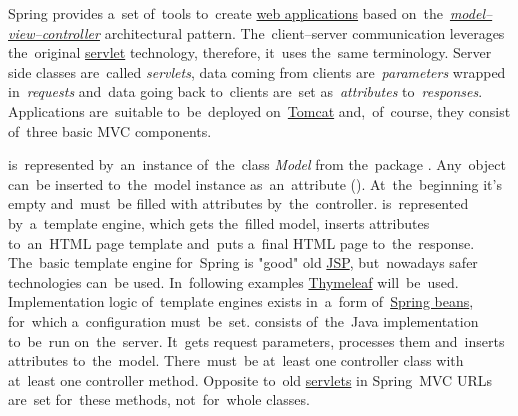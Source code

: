 
Spring provides a~set of~tools to~create \hyperref[webserviceapplication]{web applications} based on~the~\hyperref[mvc]{\textit{model--view--controller}} architectural pattern.
The~client--server communication leverages the~original \hyperref[servlet]{servlet} technology, therefore, it~uses the~same terminology.
Server side classes are~called \textit{servlets}, data coming from clients are~\textit{parameters} wrapped in~\textit{requests} and~data going back to~clients are~set as~\textit{attributes} to~\textit{responses}.
Applications are~suitable to~be~deployed on~\hyperref[tomcat]{Tomcat} and,~of~course, they consist of~three basic MVC components.

\begin{itemize}
     is~represented by~an~instance of~the~class \textit{Model} from the~package . Any~object can~be inserted to~the~model instance as~an~attribute ().
            At~the~beginning it's empty and~must~be filled with attributes by~the~controller.
     is~represented by~a~template engine, which gets the~filled model, inserts attributes to~an~HTML page template and~puts a~final HTML page to~the~response.
            The~basic template engine for~Spring is "good" old \hyperref[jsp]{JSP}, but~nowadays safer technologies can~be used.
            In~following examples \href{https://www.thymeleaf.org/}{Thymeleaf} will~be~used.
            Implementation logic of~template engines exists in~a~form of~\hyperref[springinversionofcontrol]{Spring beans}, for~which a~configuration must~be~set.
     consists of~the~Java implementation to~be~run on~the~server.
            It~gets request parameters, processes them and~inserts attributes to~the~model.
            There~must~be at~least one controller class with at~least one controller method.
            Opposite to~old \hyperref[servlet]{servlets} in Spring~MVC URLs are~set for~these methods, not~for~whole classes.
\end{itemize}
\newpage

\newpage
